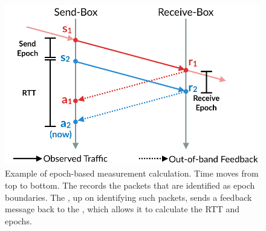 \begin{figure}
    \centering
    \includegraphics[width=\columnwidth]{img/rate-calculation}
    \caption{Example of epoch-based measurement calculation. Time moves from top to bottom.
    The \inbox records the packets that are identified as epoch boundaries. 
    The \outbox, up on identifying such packets, sends a feedback message back to
    the \inbox, which allows it to calculate the RTT and epochs.
    }\label{fig:ratecalc}
\end{figure}

